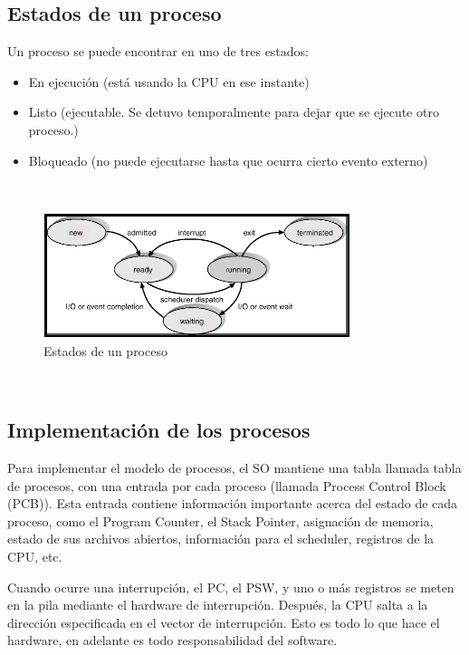 \subsection{Estados de un proceso}

Un proceso se puede encontrar en uno de tres estados:

\begin{itemize}
\item En ejecución (está usando la CPU en ese instante)
\item Listo (ejecutable. Se detuvo temporalmente para dejar que se ejecute otro proceso.)
\item Bloqueado (no puede ejecutarse hasta que ocurra cierto evento externo)
\end{itemize}

~\\
\begin{figure}[h]
	\begin{center}
	\includegraphics[width=0.8\textwidth]{imagenes/processstates.png}
	\caption{Estados de un proceso}
	\end{center}
\end{figure}
~\\

\subsection{Implementación de los procesos}

Para implementar el modelo de procesos, el SO mantiene una tabla llamada tabla de procesos, con una entrada por cada proceso (llamada Process Control Block (PCB)). Esta entrada contiene información importante acerca del estado de cada proceso, como el Program Counter, el Stack Pointer, asignación de memoria, estado de sus archivos abiertos, información para el scheduler, registros de la CPU, etc.

Cuando ocurre una interrupción, el PC, el PSW, y uno o más registros se meten en la pila mediante el hardware de interrupción. Después, la CPU salta a la dirección especificada en el vector de interrupción. Esto es todo lo que hace el hardware, en adelante es todo responsabilidad del software.

